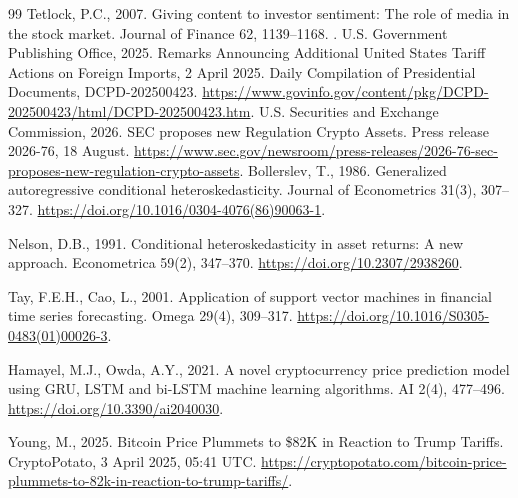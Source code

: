 \begin{thebibliography}{99}
 Tetlock, P.C., 2007. Giving content to investor sentiment: The role of media in the stock market. Journal of Finance 62, 1139--1168. .
 U.S. Government Publishing Office, 2025. Remarks Announcing Additional United States Tariff Actions on Foreign Imports, 2 April 2025. Daily Compilation of Presidential Documents, DCPD-202500423. \url{https://www.govinfo.gov/content/pkg/DCPD-202500423/html/DCPD-202500423.htm}.
 U.S. Securities and Exchange Commission, 2026. SEC proposes new Regulation Crypto Assets. Press release 2026-76, 18 August. \url{https://www.sec.gov/newsroom/press-releases/2026-76-sec-proposes-new-regulation-crypto-assets}.
Bollerslev, T., 1986. Generalized autoregressive conditional heteroskedasticity. Journal of Econometrics 31(3), 307--327. \url{https://doi.org/10.1016/0304-4076(86)90063-1}.

Nelson, D.B., 1991. Conditional heteroskedasticity in asset returns: A new approach. Econometrica 59(2), 347--370. \url{https://doi.org/10.2307/2938260}.

Tay, F.E.H., Cao, L., 2001. Application of support vector machines in financial time series forecasting. Omega 29(4), 309--317. \url{https://doi.org/10.1016/S0305-0483(01)00026-3}.

Hamayel, M.J., Owda, A.Y., 2021. A novel cryptocurrency price prediction model using GRU, LSTM and bi-LSTM machine learning algorithms. AI 2(4), 477--496. \url{https://doi.org/10.3390/ai2040030}.

 Young, M., 2025. Bitcoin Price Plummets to \$82K in Reaction to Trump Tariffs. CryptoPotato, 3 April 2025, 05:41 UTC. \url{https://cryptopotato.com/bitcoin-price-plummets-to-82k-in-reaction-to-trump-tariffs/}.
\end{thebibliography}

